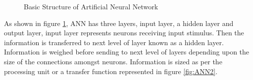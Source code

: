 \documentclass{article}[]
\begin{document}
\begin{figure}[!htb]
\centering
{}
\caption{Basic Structure of Artificial Neural Network}
\label{fig:ANN1}
\end{figure}
As shown in figure \ref{fig:ANN1}, ANN has three layers, input layer, a hidden layer and output layer, input layer represents neurons receiving input stimulus. Then the information is transferred to next level of layer known as a hidden layer. Information is weighed before sending to next level of layers depending upon the size of the connections amongst neurons. Information is sized as per the processing unit or a transfer function represented in figure \ref{fig:ANN2}.\\
\end{document}
